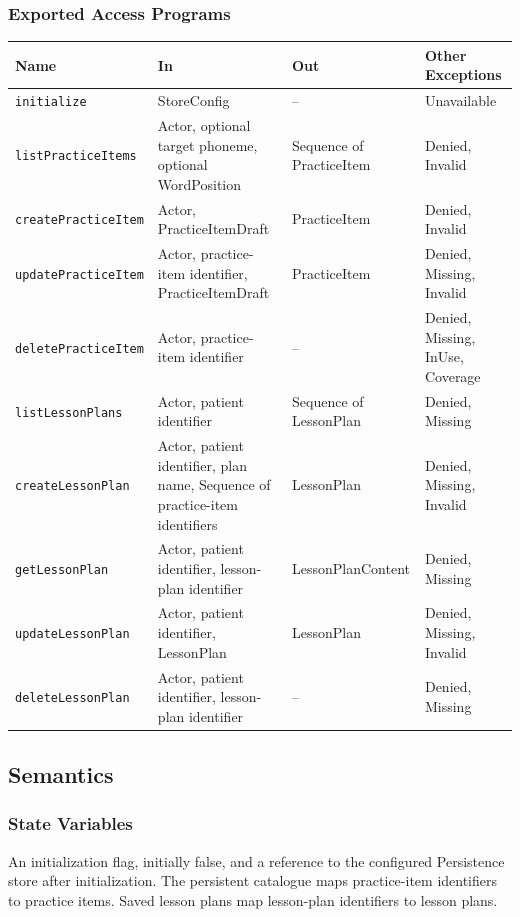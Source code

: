 \documentclass[12pt, titlepage]{article}
\begin{document}
\subsubsection{Exported Access Programs}
\noindent\begin{tabularx}{\textwidth}{@{} l >{\raggedright\arraybackslash}X >{\raggedright\arraybackslash}p{2.5cm} >{\raggedright\arraybackslash}p{3.5cm} @{}}
\toprule
\textbf{Name} & \textbf{In} & \textbf{Out} & \textbf{Other Exceptions}\\
\midrule
\texttt{initialize} & StoreConfig & -- & Unavailable\\
\texttt{listPracticeItems} & Actor, optional target phoneme, optional WordPosition & Sequence of PracticeItem & Denied, Invalid\\
\texttt{createPracticeItem} & Actor, PracticeItemDraft & PracticeItem & Denied, Invalid\\
\texttt{updatePracticeItem} & Actor, practice-item identifier, PracticeItemDraft & PracticeItem & Denied, Missing, Invalid\\
\texttt{deletePracticeItem} & Actor, practice-item identifier & -- & Denied, Missing, InUse, Coverage\\
\texttt{listLessonPlans} & Actor, patient identifier & Sequence of LessonPlan & Denied, Missing\\
\texttt{createLessonPlan} & Actor, patient identifier, plan name, Sequence of practice-item identifiers & LessonPlan & Denied, Missing, Invalid\\
\texttt{getLessonPlan} & Actor, patient identifier, lesson-plan identifier & LessonPlanContent & Denied, Missing\\
\texttt{updateLessonPlan} & Actor, patient identifier, LessonPlan & LessonPlan & Denied, Missing, Invalid\\
\texttt{deleteLessonPlan} & Actor, patient identifier, lesson-plan identifier & -- & Denied, Missing\\
\bottomrule
\end{tabularx}

\subsection{Semantics}

\subsubsection{State Variables}
An initialization flag, initially false, and a reference to the configured
Persistence store after initialization. The persistent catalogue maps
practice-item identifiers to practice items. Saved lesson plans map
lesson-plan identifiers to lesson plans.
\end{document}
